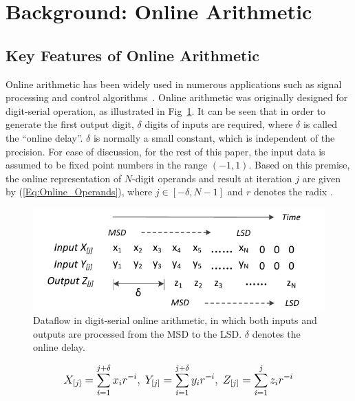 \documentclass[conference]{IEEEtran}
\begin{document}
\section{Background: Online Arithmetic}\label{Sec:Background}\vspace{-0.5ex}
\subsection{Key Features of Online Arithmetic}\vspace{-0.5ex}

Online arithmetic has been widely used in numerous applications such as signal processing and control algorithms~\cite{Online_FPGADSP,Online_Control}. Online arithmetic was originally designed for digit-serial operation, as illustrated in Fig~\ref{Fig:OnlineDataFlow}. It can be seen that in order to generate the first output digit, $\delta$ digits of inputs are required, where $\delta$ is called the ``online delay''. $\delta$ is normally a small constant, which is independent of the precision. For ease of discussion, for the rest of this paper, the input data is assumed to be fixed point numbers in the range $(-1,1)$. Based on this premise, the online representation of $N$-digit operands and result at iteration $j$ are given by (\ref{Eq:Online_Operands}), where $j\in[-\delta,N-1]$ and $r$ denotes the radix \cite{Ercegovac_Book}.\vspace{-0.5ex}
%
\begin{figure}[tbp]
  \centering
  \includegraphics[width=.48\textwidth]{./Figures/OnlineArithmetic_DataFlow.pdf}
  \vspace{-4ex}
  \caption{Dataflow in digit-serial online arithmetic, in which both inputs and outputs are processed from the MSD to the LSD. $\delta$ denotes the online delay.}
  \vspace{-1ex}
  \label{Fig:OnlineDataFlow}
\end{figure}
%
\begin{eqnarray}\label{Eq:Online_Operands}
\footnotesize
  X_{[j]}=\sum_{i=1}^{j+\delta}x_ir^{-i},~Y_{[j]}=\sum_{i=1}^{j+\delta}y_ir^{-i},~Z_{[j]}=\sum_{i=1}^{j}z_ir^{-i}
\normalsize
\end{eqnarray}
\end{document}

